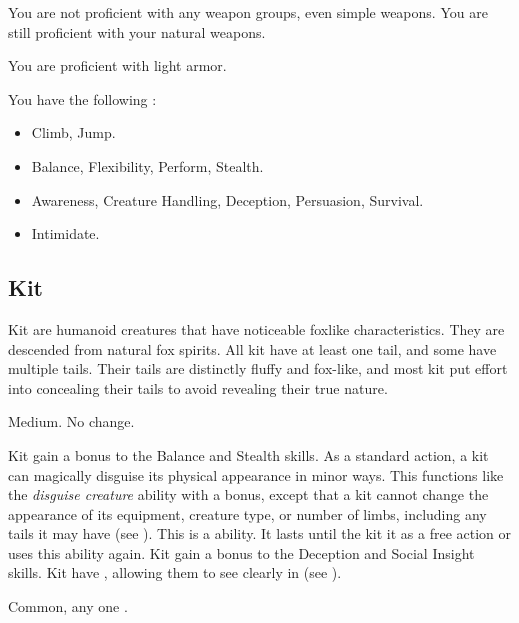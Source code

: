             You are not proficient with any weapon groups, even simple weapons.
            You are still proficient with your natural weapons.

            You are proficient with light armor.

            You have the following :
            \begin{itemize}
                \item {} Climb, Jump.
                \item {} Balance, Flexibility, Perform, Stealth.
                \item {} Awareness, Creature Handling, Deception, Persuasion, Survival.
                \item {} Intimidate.
            \end{itemize}

    \subsection{Kit}

        Kit are humanoid creatures that have noticeable foxlike characteristics.
        They are descended from natural fox spirits.
        All kit have at least one tail, and some have multiple tails.
        Their tails are distinctly fluffy and fox-like, and most kit put effort into concealing their tails to avoid revealing their true nature.

         Medium.
         No change.
        \begin{itemize}
             Kit gain a  bonus to the Balance and Stealth skills.
             As a standard action, a kit can magically disguise its physical appearance in minor ways.
                This functions like the \textit{disguise creature} ability with a  bonus, except that a kit cannot change the appearance of its equipment, creature type, or number of limbs, including any tails it may have (see ).
                This is a \magical ability.
                It lasts until the kit  it as a free action or uses this ability again.
             Kit gain a  bonus to the Deception and Social Insight skills.
             Kit have , allowing them to see clearly in  (see ).
        \end{itemize}
         Common, any one .


